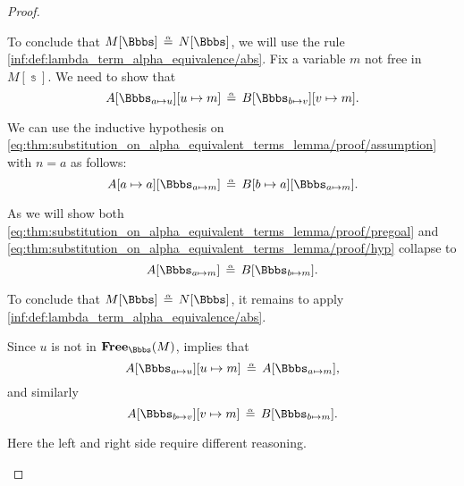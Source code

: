 \begin{proof}
\begin{itemize}
    To conclude that \( M[\Bbbs] \aequiv N[\Bbbs] \), we will use the rule \ref{inf:def:lambda_term_alpha_equivalence/abs}. Fix a variable \( m \) not free in \( M[\Bbbs] \). We need to show that
    \begin{equation}\label{eq:thm:substitution_on_alpha_equivalent_terms_lemma/proof/pregoal}
      A[\Bbbs_{a \mapsto u}][u \mapsto m] \aequiv B[\Bbbs_{b \mapsto v}][v \mapsto m].
    \end{equation}

    We can use the inductive hypothesis on \eqref{eq:thm:substitution_on_alpha_equivalent_terms_lemma/proof/assumption} with \( n = a \) as follows:
    \begin{equation}\label{eq:thm:substitution_on_alpha_equivalent_terms_lemma/proof/hyp}
      A[a \mapsto a][\Bbbs_{a \mapsto m}] \aequiv B[b \mapsto a][\Bbbs_{a \mapsto m}].
    \end{equation}

    As we will show both \eqref{eq:thm:substitution_on_alpha_equivalent_terms_lemma/proof/pregoal} and \eqref{eq:thm:substitution_on_alpha_equivalent_terms_lemma/proof/hyp} collapse to
    \begin{equation}\label{eq:thm:substitution_on_alpha_equivalent_terms_lemma/proof/goal}
      A[\Bbbs_{a \mapsto m}] \aequiv B[\Bbbs_{b \mapsto m}].
    \end{equation}

    To conclude that \( M[\Bbbs] \aequiv N[\Bbbs] \), it remains to apply \ref{inf:def:lambda_term_alpha_equivalence/abs}.

     Since \( u \) is not in \( \op*{Free}_\Bbbs(M) \),  implies that
    \begin{equation*}
      A[\Bbbs_{a \mapsto u}][u \mapsto m] \aequiv A[\Bbbs_{a \mapsto m}],
    \end{equation*}
    and similarly
    \begin{equation*}
      A[\Bbbs_{b \mapsto v}][v \mapsto m] \aequiv B[\Bbbs_{b \mapsto m}].
    \end{equation*}

     Here the left and right side require different reasoning.


\end{itemize}
\end{proof}
